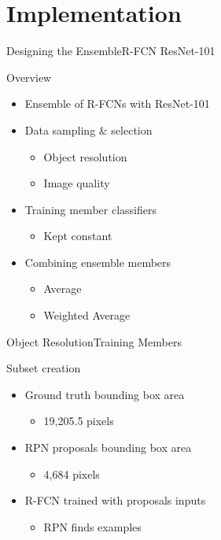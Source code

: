 \section{Implementation}
\begin{frame}{Designing the Ensemble}{R-FCN ResNet-101}
    \begin{block}{Overview}
    \begin{itemize}
        \item Ensemble of R-FCNs with ResNet-101
        \item Data sampling \& selection
        \begin{itemize}
            \item Object resolution
            \item Image quality
        \end{itemize}
        \item Training member classifiers
        \begin{itemize}
            \item Kept constant
        \end{itemize}
        \item Combining ensemble members
        \begin{itemize}
            \item Average
            \item Weighted Average
        \end{itemize}       
    \end{itemize}
\end{block}
\end{frame}

\begin{frame}{Object Resolution}{Training Members}
        \begin{block}{Subset creation}
        \begin{itemize}
            \item Ground truth bounding box area
            \begin{itemize}
                \item 19,205.5 pixels
            \end{itemize}
            \item RPN proposals bounding box area
            \begin{itemize}
                \item 4,684 pixels
            \end{itemize}
            \item R-FCN trained with proposals inputs
            \begin{itemize}
                \item RPN finds examples
            \end{itemize}
        \end{itemize}
    \end{block}
\end{frame}

